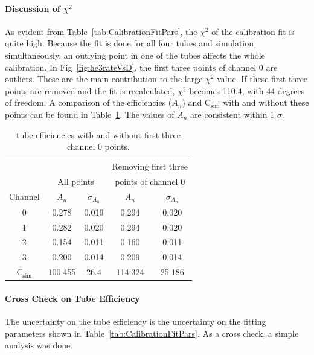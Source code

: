 \paragraph{Discussion of $\chi^{2}$}

	As evident from Table~\ref{tab:CalibrationFitPars}, the $\chi^2$ of the calibration fit is quite high. Because the fit is done for all four tubes and simulation simultaneously, an outlying point in one of the tubes affects the whole calibration. In Fig~\ref{fig:he3rateVsD}, the first three points of channel 0 are outliers. These are the main contribution to the large $\chi^2$ value. If these first three points are removed and the fit is recalculated, $\chi^2$ becomes 110.4, with 44 degrees of freedom. A comparison of the efficiencies ($A_{n}$) and C$_{\mathrm{sim}}$ with and without these points can be found in Table~\ref{tab:he3ChiCompare}. The values of $A_{n}$ are consistent within 1 $\sigma$.

\begin{table}[htb]
	\centering
	\begin{tabular}{ccccc}
	&		&		&	 \multicolumn{2}{c}{Removing first three}			\\	
	&	 \multicolumn{2}{c}{All points}			&	 \multicolumn{2}{c}{points of channel 0}			\\	
Channel	&	$A_{n}$	&	$\sigma_{A_{n}}$	&	$A_{n}$	&	$\sigma_{A_{n}}$	\\ \hline \hline	
0	&	0.278	&	0.019	&	0.294	&	0.020	\\	
1	&	0.282	&	0.020	&	0.294	&	0.020	\\	
2	&	0.154	&	0.011	&	0.160	&	0.011	\\	
3	&	0.200	&	0.014	&	0.209	&	0.014	\\	
C$_{\mathrm{sim}}$ &  100.455 & 26.4    &	114.324 &	25.186  \\	\hline

	\end{tabular}
	\caption[\He tube efficiencies with and without first three channel 0 points]{\He tube efficiencies with and without first three channel 0 points.}
	\label{tab:he3ChiCompare}
\end{table}


\paragraph{Cross Check on \He Tube Efficiency}

	The uncertainty on the \he tube efficiency is the uncertainty on the fitting parameters shown in Table~\ref{tab:CalibrationFitPars}. As a cross check, a simple analysis was done.

